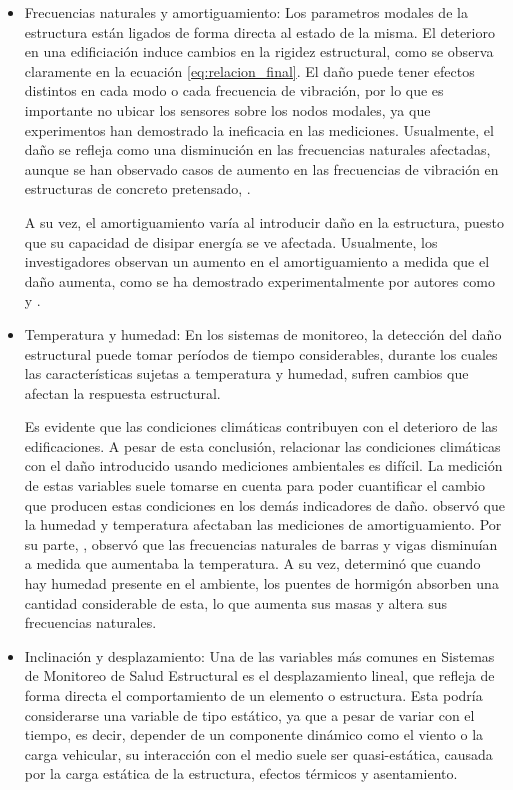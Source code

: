     \begin{itemize}
        \item Frecuencias naturales y amortiguamiento: Los parametros modales de la estructura están ligados de forma directa al estado de la misma. El deterioro en una edificiación induce cambios en la rigidez estructural, como se observa claramente en la ecuación \ref{eq:relacion_final}. El daño puede tener efectos distintos en cada modo o cada frecuencia de vibración, por lo que es importante no ubicar los sensores sobre los nodos modales, ya que experimentos han demostrado la ineficacia en las mediciones. Usualmente, el daño se refleja como una disminución en las frecuencias naturales afectadas, aunque se han observado casos de aumento en las frecuencias de vibración en estructuras de concreto pretensado, \citep{rytter1993vibration}.
        
        A su vez, el amortiguamiento varía al introducir daño en la estructura, puesto que su capacidad de disipar energía se ve afectada. Usualmente, los investigadores observan un aumento en el amortiguamiento a medida que el daño aumenta, como se ha demostrado experimentalmente por autores como \citet{hearn1991modal} y \citet{rytter1993vibration}.

        \item Temperatura y humedad: En los sistemas de monitoreo, la detección del daño estructural puede tomar períodos de tiempo considerables, durante los cuales las características sujetas a temperatura y humedad, sufren cambios que afectan la respuesta estructural.
                
        Es evidente que las condiciones climáticas contribuyen con el deterioro de las edificaciones. A pesar de esta conclusión, relacionar las condiciones climáticas con el daño introducido usando mediciones ambientales es difícil. La medición de estas variables suele tomarse en cuenta para poder cuantificar el cambio que producen estas condiciones en los demás indicadores de daño. \citet{rytter1993vibration} observó que la humedad y temperatura afectaban las mediciones de amortiguamiento. Por su parte, \citet{mohamed2014}, observó que las frecuencias naturales de barras y vigas disminuían a medida que aumentaba la temperatura. A su vez, \citet{sohn2007effects} determinó que cuando hay humedad presente en el ambiente, los puentes de hormigón absorben una cantidad considerable de esta, lo que aumenta sus masas y altera sus frecuencias naturales.
        
        \item Inclinación y desplazamiento: Una de las variables más comunes en Sistemas de Monitoreo de Salud Estructural es el desplazamiento lineal, que refleja de forma directa el comportamiento de un elemento o estructura. Esta podría considerarse una variable de tipo estático, ya que a pesar de variar con el tiempo, es decir, depender de un componente dinámico como el viento o la carga vehicular, su interacción con el medio suele ser quasi-estática, causada por la carga estática de la estructura, efectos térmicos y asentamiento.
        

\end{itemize}
